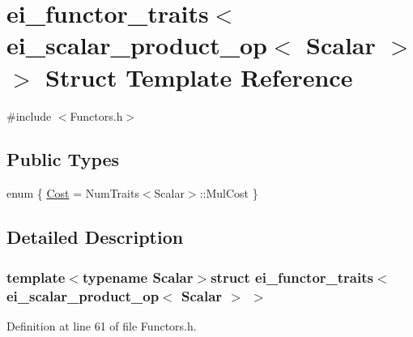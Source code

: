 \hypertarget{structei__functor__traits_3_01ei__scalar__product__op_3_01_scalar_01_4_01_4}{\section{ei\-\_\-functor\-\_\-traits$<$ ei\-\_\-scalar\-\_\-product\-\_\-op$<$ Scalar $>$ $>$ Struct Template Reference}
\label{structei__functor__traits_3_01ei__scalar__product__op_3_01_scalar_01_4_01_4}
}


{\ttfamily \#include $<$Functors.\-h$>$}

\subsection*{Public Types}
\begin{DoxyCompactItemize}
\item 
enum \{ \hyperlink{structei__functor__traits_3_01ei__scalar__product__op_3_01_scalar_01_4_01_4_a92d6f94734f47394002b8416b39b9386a7f9bfce75997c8530353322711c38f92}{Cost} = Num\-Traits$<$Scalar$>$\-:\-:Mul\-Cost
 \}
\end{DoxyCompactItemize}


\subsection{Detailed Description}
\subsubsection*{template$<$typename Scalar$>$struct ei\-\_\-functor\-\_\-traits$<$ ei\-\_\-scalar\-\_\-product\-\_\-op$<$ Scalar $>$ $>$}



Definition at line 61 of file Functors.\-h.



